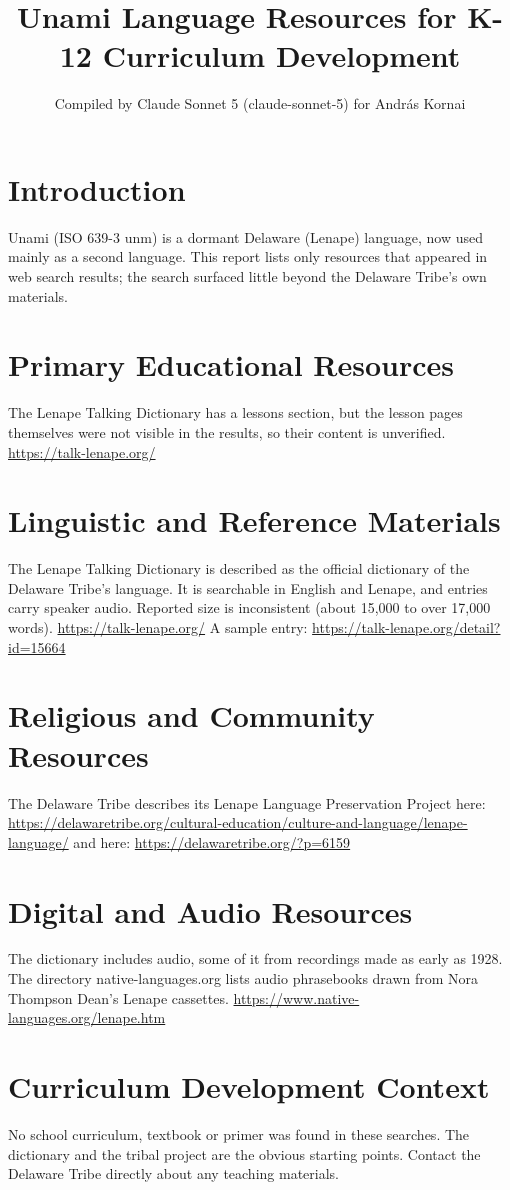 \documentclass[12pt]{article}
\title{Unami Language Resources for K-12 Curriculum Development}
\author{Compiled by Claude Sonnet 5 (claude-sonnet-5) for Andr\'as Kornai}
\date{}
\begin{document}
\maketitle
\section{Introduction}
Unami (ISO 639-3 unm) is a dormant Delaware (Lenape) language, now used mainly as a second language. This report lists only resources that appeared in web search results; the search surfaced little beyond the Delaware Tribe's own materials.
\section{Primary Educational Resources}
The Lenape Talking Dictionary has a lessons section, but the lesson pages themselves were not visible in the results, so their content is unverified. \url{https://talk-lenape.org/}
\section{Linguistic and Reference Materials}
The Lenape Talking Dictionary is described as the official dictionary of the Delaware Tribe's language. It is searchable in English and Lenape, and entries carry speaker audio. Reported size is inconsistent (about 15,000 to over 17,000 words). \url{https://talk-lenape.org/} A sample entry: \url{https://talk-lenape.org/detail?id=15664}
\section{Religious and Community Resources}
The Delaware Tribe describes its Lenape Language Preservation Project here: \url{https://delawaretribe.org/cultural-education/culture-and-language/lenape-language/} and here: \url{https://delawaretribe.org/?p=6159}
\section{Digital and Audio Resources}
The dictionary includes audio, some of it from recordings made as early as 1928. The directory native-languages.org lists audio phrasebooks drawn from Nora Thompson Dean's Lenape cassettes. \url{https://www.native-languages.org/lenape.htm}
\section{Curriculum Development Context}
No school curriculum, textbook or primer was found in these searches. The dictionary and the tribal project are the obvious starting points. Contact the Delaware Tribe directly about any teaching materials.
\end{document}
